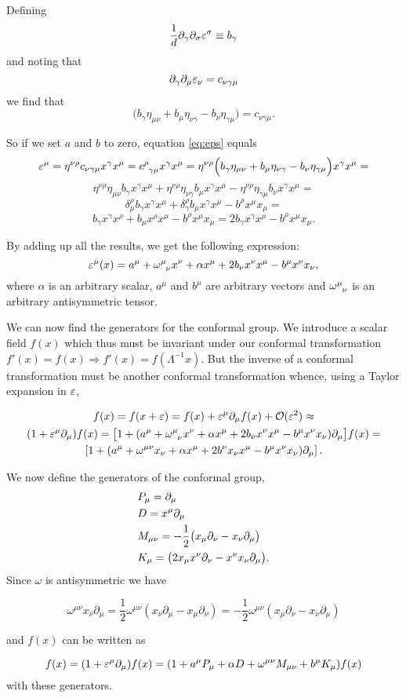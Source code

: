 Defining
$$
\frac{1}{d}\partial_\gamma \partial_\sigma \varepsilon^\sigma 
\equiv b_\gamma
$$
and noting that
$$
\partial_\gamma \partial_\mu \varepsilon_\nu
 = c_{\nu \gamma \mu}
$$
we find that
$$
\big(b_\gamma \eta_{\mu \nu}
+b_\mu \eta_{\nu \gamma}
-b_\nu\eta_{\gamma \mu}  \big)
= c_{\nu \gamma \mu}.
$$

So if we set $a$ and $b$ to zero, equation \ref{eq:eps} equals
$$
\ep^\mu= 
\eta^{\nu \rho}c_{\nu \gamma \mu}x^\gamma x^\mu
=c\ein{\rho}{\gamma \mu}x^\gamma x^\mu
=\eta^{\nu \rho}\Big(b_\gamma \eta_{\mu \nu}
+b_\mu \eta_{\nu \gamma}-b_\nu\eta_{\gamma \mu} \Big)x^\gamma x^\mu
=
$$$$
\eta^{\nu \rho}\eta_{\mu \nu} b_\gamma x^\gamma x^\mu
+\eta^{\nu \rho}\eta_{\nu \gamma} b_\mu x^\gamma x^\mu
-\eta^{\nu \rho}\eta_{\gamma \mu} b_\nu x^\gamma x^\mu=
$$$$
\delta^\rho _\mu b_\gamma x^\gamma x^\mu
+ \delta^\rho _\gamma b_\mu x^\gamma x^\mu 
- b^\rho x^\mu x_\mu=
$$$$
b_\gamma x^\gamma x^\rho 
+b_\mu x^\rho x^\mu- b^\rho x^\mu x_\mu
=2 b_\gamma x^\gamma x^\rho
- b^\rho x^\mu x_\mu.
$$

 By adding up all the results, we get the following expression:
 \begin{equation}
 \ep^\mu (x)= a^\mu+ \omega \ein{\mu}{\nu}x^\nu + \alpha x^\mu+ 2b_\nu x^\nu x^\mu -b^\mu x^\nu x_\nu,
 \end{equation}
where $\alpha$ is an arbitrary scalar, $a^\mu$ and $b^\mu$ are arbitrary vectors and $\omega\ein{\mu}{\nu}$ is an arbitrary antisymmetric tensor.
 
We can now find the generators for the conformal group. We introduce a scalar field $f(x)$ which thus must be invariant under our conformal transformation $f'(x)=f(x)\Rightarrow f'(x)=f(\Lambda^{-1} x)$. But the inverse of a conformal transformation must be another conformal transformation whence, using a Taylor expansion in $\varepsilon$,

\begin{gather*}
f(x)=f(x+\ep)=f(x)+\ep^\mu \p_\mu f(x)+ \mathcal{O}(\ep^2) \approx \\ (1+\ep^\mu \p_\mu)f(x)=\big[1+(a^\mu+ \omega \ein{\mu}{\nu}x^\nu + \alpha x^\mu +2b_\nu x^\nu x^\mu -b^\mu x^\nu x_\nu)\p_\mu \big]f(x)= \\ \left[1+(a^\mu+\omega^{\mu\nu}x_\nu+\alpha x^\mu+2b^\nu x_\nu x^\mu-b^\mu x^\nu x_\nu)\p_\mu\right].
\end{gather*}

We now define the generators of the conformal group,
\begin{align}
&P_\mu=\partial_\mu \\
&D= x^\mu \partial_\mu \\
&M_{\mu \nu}=-\frac{1}{2}\big(x_\mu \partial_\nu -x_\nu \partial_\mu \big) \\
&K_\mu=\big( 2x_\mu x^\nu \partial_\nu - x^\nu x_\nu \partial_\mu\big).
\end{align}
Since $\omega$ is antisymmetric we have

$$\omega^{\mu\nu}x_\nu\partial_\mu=
\frac{1}{2}\omega^{\mu\nu}(x_\nu\partial_\mu-x_\mu\partial_\nu)=-\frac{1}{2}\omega^{\mu\nu}(x_\mu\partial_\nu-x_\nu\partial_\mu)$$

and $f(x)$ can be written as



$$
f(x)=(1+\varepsilon^\mu \partial_\mu)f(x)=(1+ a^\mu P_\mu+ \alpha D+ \omega^{\mu\nu}M_{\mu\nu}+b^\mu K_\mu  ) f(x)
$$
with these generators.
